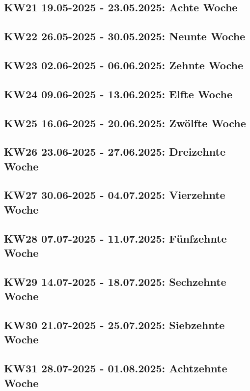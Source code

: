 \subsection{KW21 19.05-2025 - 23.05.2025: Achte Woche}


\subsection{KW22 26.05-2025 - 30.05.2025: Neunte Woche}


\subsection{KW23 02.06-2025 - 06.06.2025: Zehnte Woche}


\subsection{KW24 09.06-2025 - 13.06.2025: Elfte Woche}


\subsection{KW25 16.06-2025 - 20.06.2025: Zwölfte Woche}


\subsection{KW26 23.06-2025 - 27.06.2025: Dreizehnte Woche}


\subsection{KW27 30.06-2025 - 04.07.2025: Vierzehnte Woche}


\subsection{KW28 07.07-2025 - 11.07.2025: Fünfzehnte Woche}


\subsection{KW29 14.07-2025 - 18.07.2025: Sechzehnte Woche}


\subsection{KW30 21.07-2025 - 25.07.2025: Siebzehnte Woche}


\subsection{KW31 28.07-2025 - 01.08.2025: Achtzehnte Woche}


